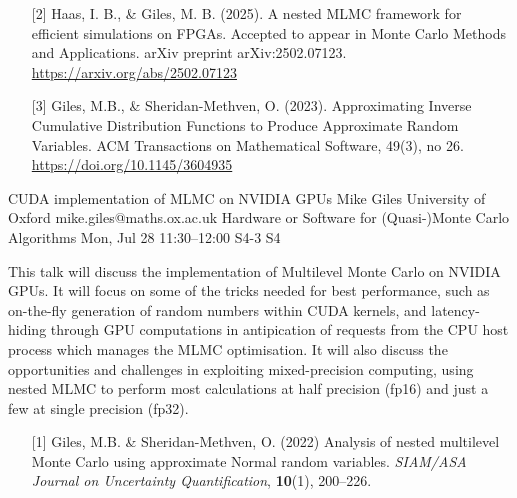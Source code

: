 \begin{talk}
\begin{enumerate}
    \item[{[2]}] Haas, I. B., \& Giles, M. B. (2025). A nested MLMC framework for efficient simulations on FPGAs. Accepted to appear in Monte Carlo Methods and Applications. arXiv preprint arXiv:2502.07123. \url{https://arxiv.org/abs/2502.07123}

     \item[{[3]}] Giles, M.B., \& Sheridan-Methven, O. (2023). Approximating Inverse Cumulative Distribution Functions to Produce Approximate Random Variables. ACM Transactions on Mathematical Software, 49(3), no 26. \url{https://doi.org/10.1145/3604935}
\end{enumerate}

\end{talk}

\begin{talk}
  {CUDA implementation of MLMC on NVIDIA GPUs}%
  {Mike Giles}%
  {University of Oxford}%
  {mike.giles@maths.ox.ac.uk}%
  {Hardware or Software for (Quasi-)Monte Carlo Algorithms}%
  {}%
  {Mon, Jul 28 11:30–12:00}%
  {S4-3}%
  {S4}%
				
			

This talk will discuss the implementation of Multilevel Monte Carlo
on NVIDIA GPUs.  It will focus on some of the tricks needed for best
performance, such as on-the-fly generation of random numbers within
CUDA kernels, and latency-hiding through GPU computations in antipication
of requests from the CPU host process which manages the MLMC optimisation.
It will also discuss the opportunities and challenges in exploiting
mixed-precision computing, using nested MLMC to perform most calculations
at half precision (fp16) and just a few at single precision (fp32).

\medskip

\begin{enumerate}
\item[{[1]}] Giles, M.B. \& Sheridan-Methven, O. (2022)
  Analysis of nested multilevel Monte Carlo using approximate
  Normal random variables. {\it SIAM/ASA
Journal on Uncertainty Quantification}, \textbf{10}(1), 200--226.
\end{enumerate}

\end{talk}


